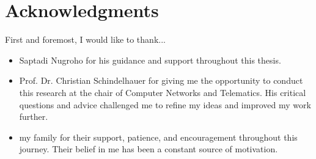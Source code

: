 \chapter{Acknowledgments}

First and foremost, I would like to thank...
\begin{itemize}
\item{Saptadi Nugroho for his guidance and support throughout this thesis.}
\item{Prof. Dr. Christian Schindelhauer for giving me the opportunity to conduct this research at the chair of Computer Networks and Telematics. His critical questions and advice challenged me to refine my ideas and improved my work further.}
\item{my family for their support, patience, and encouragement throughout this journey. Their belief in me has been a constant source of motivation.}
\end{itemize}